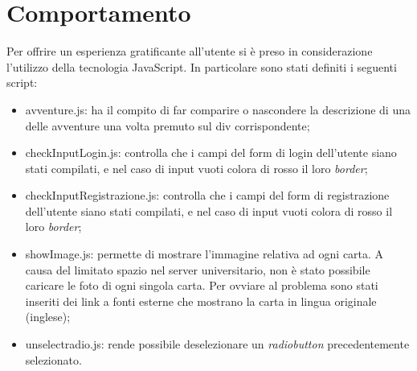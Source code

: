 \section{Comportamento}
Per offrire un esperienza gratificante all'utente si è preso in considerazione l'utilizzo della tecnologia JavaScript. In particolare sono stati definiti i seguenti script:\\
\begin{itemize}
	\item{avventure.js}: ha il compito di far comparire o nascondere la descrizione di una delle avventure una volta premuto sul div corrispondente;
	\item{checkInputLogin.js}: controlla che i campi del form di login dell'utente siano stati compilati, e nel caso di input vuoti colora di rosso il loro \textit{border};
	\item{checkInputRegistrazione.js}: controlla che i campi del form di registrazione dell'utente siano stati compilati, e nel caso di input vuoti colora di rosso il loro \textit{border};
	\item{showImage.js}: permette di mostrare l'immagine relativa ad ogni carta.  A causa del limitato spazio nel server universitario, non è stato possibile caricare le foto di ogni singola carta. Per ovviare al problema sono stati inseriti dei link a fonti esterne che mostrano la carta in lingua originale (inglese);
	\item{unselectradio.js}: rende possibile deselezionare un \textit{radiobutton} precedentemente selezionato.
\end{itemize}


\newpage